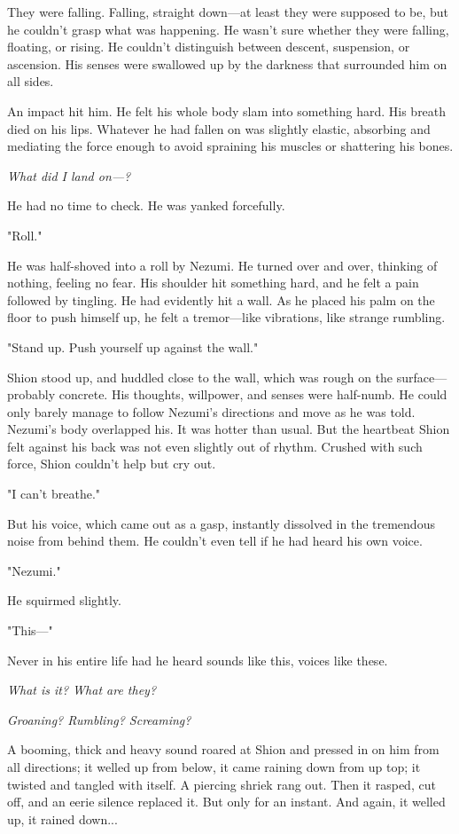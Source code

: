 They were falling. Falling, straight down---at least they were supposed to
be, but he couldn't grasp what was happening. He wasn't sure whether
they were falling, floating, or rising. He couldn't distinguish between
descent, suspension, or ascension. His senses were swallowed up by the
darkness that surrounded him on all sides.

An impact hit him. He felt his whole body slam into something hard. His
breath died on his lips. Whatever he had fallen on was slightly elastic,
absorbing and mediating the force enough to avoid spraining his muscles
or shattering his bones.

\emph{What did I land on---?}

He had no time to check. He was yanked forcefully.

"Roll."

He was half-shoved into a roll by Nezumi. He turned over and over,
thinking of nothing, feeling no fear. His shoulder hit something hard,
and he felt a pain followed by tingling. He had evidently hit a wall. As
he placed his palm on the floor to push himself up, he felt a
tremor---like vibrations, like strange rumbling.

"Stand up. Push yourself up against the wall."

Shion stood up, and huddled close to the wall, which was rough on the
surface---probably concrete. His thoughts, willpower, and senses were
half-numb. He could only barely manage to follow Nezumi's directions and
move as he was told. Nezumi's body overlapped his. It was hotter than
usual. But the heartbeat Shion felt against his back was not even
slightly out of rhythm. Crushed with such force, Shion couldn't help but
cry out.

"I can't breathe."

But his voice, which came out as a gasp, instantly dissolved in the
tremendous noise from behind them. He couldn't even tell if he had heard
his own voice.

"Nezumi."

He squirmed slightly.

"This---"

Never in his entire life had he heard sounds like this, voices like
these.

\emph{What is it? What are they?}

\emph{Groaning? Rumbling? Screaming?}

A booming, thick and heavy sound roared at Shion and pressed in on him
from all directions; it welled up from below, it came raining down from
up top; it twisted and tangled with itself. A piercing shriek rang out.
Then it rasped, cut off, and an eerie silence replaced it. But only for
an instant. And again, it welled up, it rained down...


